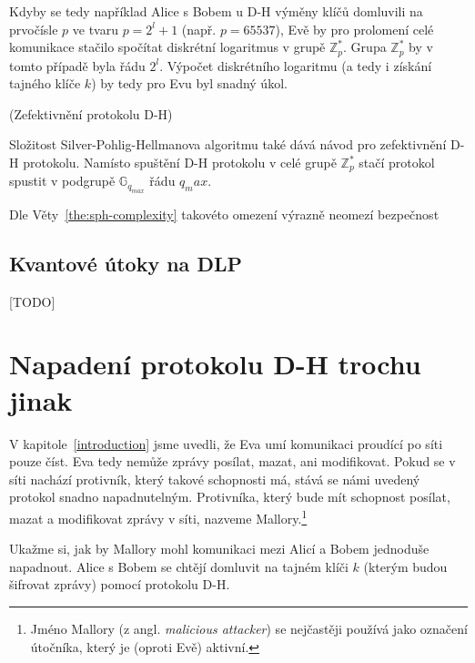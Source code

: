\documentclass[
  program=infoi,
  biblatex,
  figures=false,
  glossaries,
  index
]{kidiplom}
\begin{document}
            Kdyby se tedy například Alice s Bobem u D-H výměny klíčů domluvili na prvočísle $p$ ve tvaru $p = 2^l + 1$ (např. $p = 65537$),
            Evě by pro prolomení celé komunikace stačilo spočítat diskrétní logaritmus v grupě $\mathbb{Z}^*_p$.
            Grupa $\mathbb{Z}^*_p$ by v tomto případě byla řádu $2^l$.
            Výpočet diskrétního logaritmu (a tedy i získání tajného klíče $k$) by tedy pro Evu byl snadný úkol. 


            \begin{remark}\label{rem:diffie-hellman-improved}
                (Zefektivnění protokolu D-H)

                Složitost Silver-Pohlig-Hellmanova algoritmu také dává návod pro zefektivnění D-H protokolu.
                Namísto spuštění D-H protokolu v celé grupě $\mathbb{Z}^*_p$ stačí protokol spustit
                v podgrupě $\mathbb{G}_{q_{max}}$ řádu $q_max$.
            
                Dle Věty~\ref{the:sph-complexity} takovéto omezení výrazně neomezí bezpečnost
            \end{remark}
    

        \subsection{Kvantové útoky na DLP}

            [TODO]
    






\section{Napadení protokolu D-H trochu jinak}


    V kapitole~\ref{introduction} jsme uvedli, že Eva umí komunikaci proudící po síti pouze číst. Eva tedy nemůže zprávy posílat, mazat, ani modifikovat.
    Pokud se v síti nachází protivník, který takové schopnosti má, stává se námi uvedený protokol snadno napadnutelným. Protivníka, který bude mít
    schopnost posílat, mazat a modifikovat zprávy v síti, nazveme Mallory.\footnote{Jméno Mallory (z angl. \emph{malicious attacker}) se nejčastěji používá jako
    označení útočníka, který je (oproti Evě) aktivní.}

    \bigskip

    Ukažme si, jak by Mallory mohl komunikaci mezi Alicí a Bobem jednoduše napadnout.
    Alice s Bobem se chtějí domluvit na tajném klíči $k$ (kterým budou šifrovat zprávy) pomocí protokolu D-H.
\end{document}
